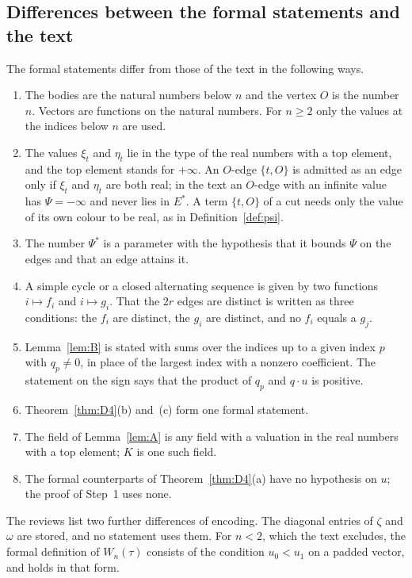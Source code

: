 \documentclass[11pt]{amsart}
\theoremstyle{definition}
\theoremstyle{remark}
\numberwithin{equation}{section}
\newcommand{\repo}[1]{\texttt{\detokenize{#1}}}
\newcommand{\Ps}{\Psi^{*}}
\newcommand{\Es}{E^{*}}
\begin{document}
\subsection*{Differences between the formal statements and the text} The formal statements differ from
those of the text in the following ways.
\begin{enumerate}
\item The bodies are the natural numbers below $n$ and the vertex $O$ is the number $n$. Vectors are
functions on the natural numbers. For $n \ge 2$ only the values at the indices below $n$ are used.
\item The values $\xi_t$ and $\eta_t$ lie in the type of the real numbers with a top element, and the
top element stands for $+\infty$. An $O$-edge $\{t, O\}$ is admitted as an edge only if $\xi_t$ and
$\eta_t$ are both real; in the text an $O$-edge with an infinite value has $\Psi = -\infty$ and never
lies in $\Es$. A term $\{t, O\}$ of a cut needs only the value of its own colour to be real, as in
Definition~\ref{def:psi}.
\item The number $\Ps$ is a parameter with the hypothesis that it bounds $\Psi$ on the edges and that
an edge attains it.
\item A simple cycle or a closed alternating sequence is given by two functions $i \mapsto f_i$ and
$i \mapsto g_i$. That the $2r$ edges are distinct is written as three conditions: the $f_i$ are
distinct, the $g_i$ are distinct, and no $f_i$ equals a $g_j$.
\item Lemma~\ref{lem:B} is stated with sums over the indices up to a given index $p$ with $q_p \ne 0$,
in place of the largest index with a nonzero coefficient. The statement on the sign says that the
product of $q_p$ and $q \cdot u$ is positive.
\item Theorem~\ref{thm:D4}(b) and~(c) form one formal statement.
\item The field of Lemma~\ref{lem:A} is any field with a valuation in the real numbers with a top
element; $K$ is one such field.
\item The formal counterparts of Theorem~\ref{thm:D4}(a) have no hypothesis on $u$; the proof of
Step~1 uses none.
\end{enumerate}
The reviews list two further differences of encoding. The diagonal entries of $\zeta$ and $\omega$ are
stored, and no statement uses them. For $n < 2$, which the text excludes, the formal definition of
$W_n(\tau)$ consists of the condition $u_0 < u_1$ on a padded vector, and \repo{chamber_nonempty} holds in
that form.
\end{document}
